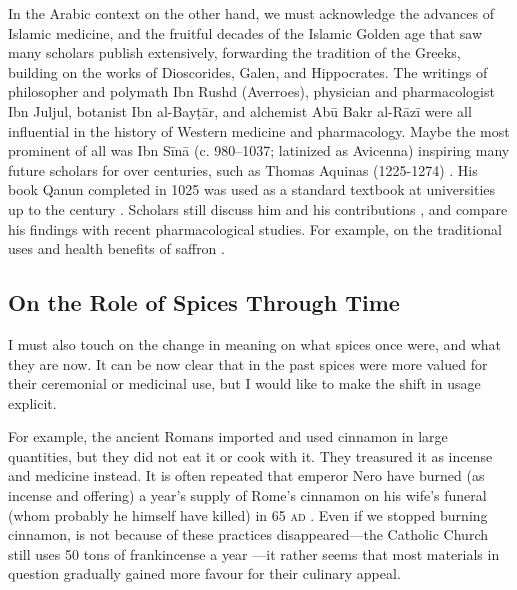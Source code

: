 In the Arabic context on the other hand, we must acknowledge the advances of Islamic medicine, and the fruitful decades of the Islamic Golden age that saw many scholars publish extensively, forwarding the tradition of the Greeks, building on the works of Dioscorides, Galen, and Hippocrates. The writings of philosopher and polymath Ibn Rushd (Averroes), physician and pharmacologist Ibn Juljul, botanist Ibn al-Bayṭār, and alchemist Abū Bakr al-Rāzī were all influential in the history of Western medicine and pharmacology. Maybe the most prominent of all was Ibn Sīnā (c. 980--1037; latinized as Avicenna) inspiring many future scholars for over centuries, such as Thomas Aquinas (1225-1274) \autocite{smith_avicenna_1980}. His book \gls{Qanun} completed in 1025 was used as a standard textbook at universities up to the  century \autocite{musallam_avicenna_1987}. Scholars still discuss him and his contributions \autocite{sajadi_ibn_2009}, and compare his findings with recent pharmacological studies. For example, on the traditional uses and health benefits of saffron \autocite[see][]{hosseinzadeh_avicennas_2013}.

\subsection{On the Role of Spices Through Time}
\label{shift}

I must also touch on the change in meaning on what spices once were, and what they are now. It can be now clear that in the past spices were more valued for their ceremonial or medicinal use, but I would like to make the shift in usage explicit. 

For example, the ancient Romans imported and used cinnamon in large quantities, but they did not eat it or cook with it. They treasured it as incense and medicine instead. It is often repeated that emperor Nero have burned (as incense and offering) a year's supply of Rome's cinnamon on his wife's funeral (whom probably he himself have killed) in 65 \textsc{ad} \autocite[437-438]{toussaint-samat_history_2009}. Even if we stopped burning cinnamon, is not because of these practices disappeared---the Catholic Church still uses 50 tons of frankincense a year \autocite{ash_why_2020}---it rather seems that most materials in question gradually gained more favour for their culinary appeal. 


